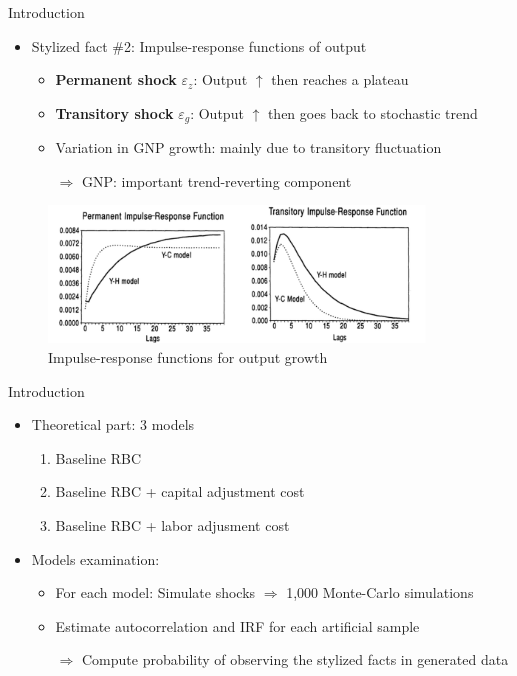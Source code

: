 \documentclass[10pt]{beamer}
\begin{document}
\begin{frame}{Introduction}
    \begin{itemize}
        \setlength\itemsep{1em}
        \item Stylized fact \#2: \alert{Impulse-response functions} of output
              \begin{itemize}
                  \item \textbf{Permanent shock} $\varepsilon_z$: Output $\uparrow$ then reaches a plateau
                  \item \textbf{Transitory shock} $\varepsilon_g$: Output $\uparrow$ then goes back to stochastic trend
                  \item Variation in GNP growth: mainly due to transitory fluctuation
                  \item[$\Rightarrow$] GNP: important \alert{trend-reverting component}
              \end{itemize}
    \end{itemize}
    \begin{figure}
        \centering
        \includegraphics[width=10cm]{figures/sf2.png}
        \caption{Impulse-response functions for output growth}
    \end{figure}
\end{frame}

\begin{frame}{Introduction}
    \begin{itemize}
        \setlength\itemsep{1em}
        \item \alert{Theoretical} part: 3 models
              \begin{enumerate}
                  \item Baseline RBC
                  \item Baseline RBC + capital adjustment cost
                  \item Baseline RBC + labor adjusment cost
              \end{enumerate}
        \item Models examination:
              \begin{itemize}
                  \item For each model: Simulate shocks $\Rightarrow$ 1,000 \alert{Monte-Carlo
                            simulations}
                  \item Estimate autocorrelation and IRF for each artificial sample
                  \item[$\Rightarrow$] Compute \alert{probability of observing the stylized facts} in generated data
              \end{itemize}
    \end{itemize}
\end{frame}
\end{document}
